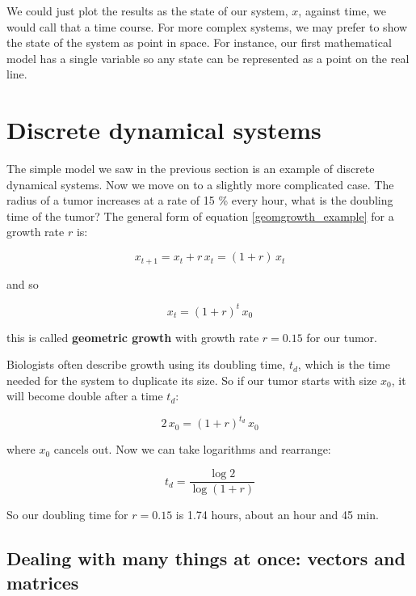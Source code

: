 \documentclass{tufte-book} %
\begin{document}
 We could just plot the results as the state of our system, $x$, against time, we would call that a time course. For more complex systems, we may prefer to show the state of the system as point in space. For instance, our first mathematical model has a single variable so any  state can be represented as a point on the real line.

\chapter{Discrete dynamical systems}

The simple model we saw in the previous section is an example of discrete dynamical systems. Now we move on to a slightly more complicated case. The radius of a tumor increases at a rate of  15 \% every hour, what is the doubling time of the tumor? The general form of equation \ref{geomgrowth_example} for a growth rate $r$ is:

\begin{equation}
\label{geomgrowth_general}
x_{t+1} = x_t  + r \, x_t =(1 + r) \, x_t
\end{equation}

and so

\begin{equation}
\label{geomgrowth_general2}
x_{t} = (1 + r)^{t} \, x_0
\end{equation}


this is called \textbf{geometric growth} with growth rate $r=0.15$ for our tumor. 



Biologists often describe growth using its doubling time, $t_d$,  which is the time needed for the system to duplicate its size. So if our tumor starts with size $x_0$, it will become double after a time $t_d$:

\begin{equation}
2\, x_{0} = (1 + r)^{t_d} \, x_0
\end{equation}

where $x_0$ cancels out. Now we can take  logarithms and rearrange:

\begin{equation}
t_d = \frac{\log 2}{\log (1 + r) }
\end{equation}

So our doubling time for $r=0.15$ is 1.74 hours, about an hour and 45 min.

\section{Dealing with many things at once: vectors and matrices}
\end{document}
